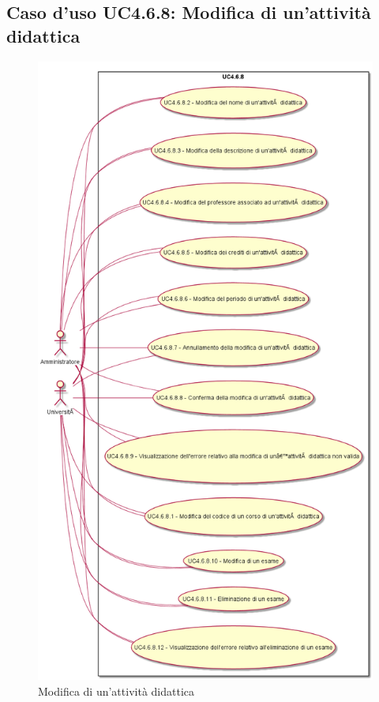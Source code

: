 \subsection{Caso d'uso \texorpdfstring{UC4.6.8}{UC4.6.8}: Modifica di un'attività didattica}
\begin{figure} [H]
\centering
\includegraphics[scale=0.45]{./img/UC4-6-8.png}
\caption{Modifica di un'attività didattica}\label{}
\end{figure}
